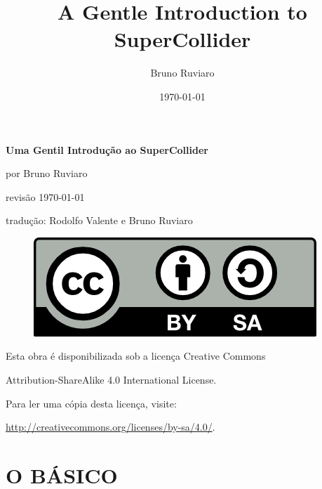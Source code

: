 \documentclass[11pt]{article}
\title{\textbf{A Gentle Introduction to SuperCollider}}
\author{Bruno Ruviaro}
\date{\today}
\begin{document}
\vspace*{\fill}
\begin{center}
{\LARGE \textbf{Uma Gentil Introdução ao SuperCollider}}

\bigskip
por Bruno Ruviaro

\medskip
revisão \today

tradução: Rodolfo Valente e Bruno Ruviaro


\bigskip
\bigskip

\begin{figure}[h]
\begin{center}
\includegraphics[scale=1]{fig-by-sa.png}
\end{center}
\end{figure}

\bigskip
Esta obra é disponibilizada sob a licença Creative Commons

Attribution-ShareAlike 4.0 International License.

Para ler uma cópia desta licença, visite:

\url{http://creativecommons.org/licenses/by-sa/4.0/}.



\end{center}
\vspace*{\fill}
\thispagestyle{empty}
\clearpage

\tableofcontents
\maketitle
{}

\renewcommand{\partname}{Parte}
\renewcommand{\figurename}{Figura}
\renewcommand{\notesname}{Notas}


\part{O BÁSICO}












\newpage
\end{document}
